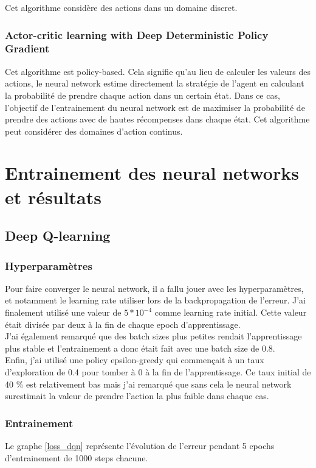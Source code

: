 \documentclass[12pt]{article}
\begin{document}
Cet algorithme considère des actions dans un domaine discret.

\subsubsection{Actor-critic learning with Deep Deterministic Policy Gradient}
Cet algorithme est policy-based. Cela signifie qu'au lieu de calculer les valeurs des actions, le neural network estime directement la stratégie de l'agent en calculant la probabilité de prendre chaque action dans un certain état. Dans ce cas, l'objectif de l'entrainement du neural network est de maximiser la probabilité de prendre des actions avec de hautes récompenses dans chaque état. Cet algorithme peut considérer des domaines d'action continus.

\section{Entrainement des neural networks et résultats}
\subsection{Deep Q-learning}
\subsubsection{Hyperparamètres}
Pour faire converger le neural network, il a fallu jouer avec les hyperparamètres, et notamment le learning rate utiliser lors de la backpropagation de l'erreur. J'ai finalement utilisé une valeur de $5 * 10^{-4}$ comme learning rate initial. Cette valeur était divisée par deux à la fin de chaque epoch d'apprentissage.\\
 
J'ai également remarqué que des batch sizes plus petites rendait l'apprentissage plus stable et l'entrainement a donc était fait avec une batch size de 0.8.\\

Enfin, j'ai utilisé une policy epsilon-greedy qui commençait à un taux d'exploration de 0.4 pour tomber à 0 à la fin de l'apprentissage. Ce taux initial de 40 \% est relativement bas mais j'ai remarqué que sans cela le neural network surestimait la valeur de prendre l'action la plus faible dans chaque cas.\\

\subsubsection{Entrainement}
Le graphe \ref{loss_dqn} représente l'évolution de l'erreur pendant 5 epochs d'entrainement de 1000 steps chacune.\\
\end{document}
